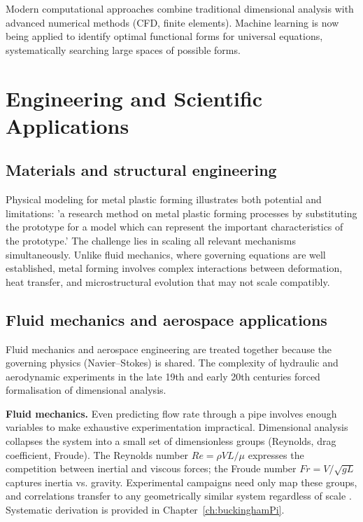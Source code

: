 Modern computational approaches combine traditional dimensional analysis with advanced numerical methods (CFD, finite elements). Machine learning is now being applied to identify optimal functional forms for universal equations, systematically searching large spaces of possible forms.

\section{Engineering and Scientific Applications}\label{ch02:EngineeringScientific}

\subsection{Materials and structural engineering}

Physical modeling for metal plastic forming \cite{liu2000} illustrates both potential and limitations: 'a research method on metal plastic forming processes by substituting the prototype for a model which can represent the important characteristics of the prototype.' The challenge lies in scaling all relevant mechanisms simultaneously. Unlike fluid mechanics, where governing equations are well established, metal forming involves complex interactions between deformation, heat transfer, and microstructural evolution that may not scale compatibly.

\subsection{Fluid mechanics and aerospace applications}

Fluid mechanics and aerospace engineering are treated together because the governing physics (Navier–Stokes) is shared. The complexity of hydraulic and aerodynamic experiments in the late 19th and early 20th centuries forced formalisation of dimensional analysis.

\textbf{Fluid mechanics.} Even predicting flow rate through a pipe involves enough variables to make exhaustive experimentation impractical. Dimensional analysis collapses the system into a small set of dimensionless groups (Reynolds, drag coefficient, Froude). The Reynolds number \(Re = \rho VL/\mu\) expresses the competition between inertial and viscous forces; the Froude number \(Fr = V/\sqrt{gL}\) captures inertia vs. gravity. Experimental campaigns need only map these groups, and correlations transfer to any geometrically similar system regardless of scale \cite{white2011}. Systematic derivation is provided in Chapter~\ref{ch:buckinghamPi}.

